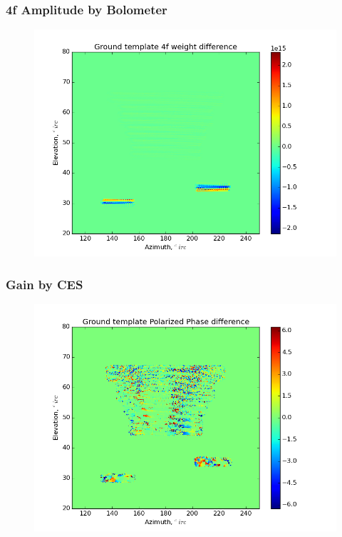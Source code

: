\documentclass{beamer}
\begin{document}
\begin{frame}
\frametitle{4f Amplitude by Bolometer}
\begin{figure}
\includegraphics[width=0.9\linewidth]{dw4_gt_AMP_4F_BY_BOLO.png}
\end{figure}
\end{frame}

\begin{frame}
\frametitle{Gain by CES}
\begin{figure}
\includegraphics[width=0.9\linewidth]{dArg_gt_GAIN_BY_CES.png}
\end{figure}
\end{frame}
\end{document}
